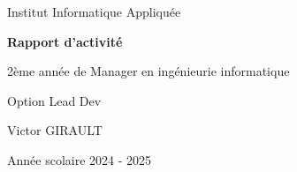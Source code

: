 \documentclass[12pt]{article}
\begin{document}
\begin{titlepage}
    \centering
    {\Huge Institut Informatique Appliquée\par}
    \vspace*{6cm}
    {\Huge \textbf{Rapport d'activité}}\par
    \vspace{.5cm}
    {\LARGE 2ème année de Manager en ingénieurie informatique}\par
    \vspace{0.4cm}
    {\Large Option Lead Dev}\par
    \vspace{9cm}
    {\Large Victor GIRAULT\par}
    \vspace{1cm}
    \vfill
    {\Large Année scolaire 2024 - 2025\par}
\end{titlepage}

\newpage
\tableofcontents
\thispagestyle{empty}
\newpage
\setcounter{page}{1}
\end{document}

